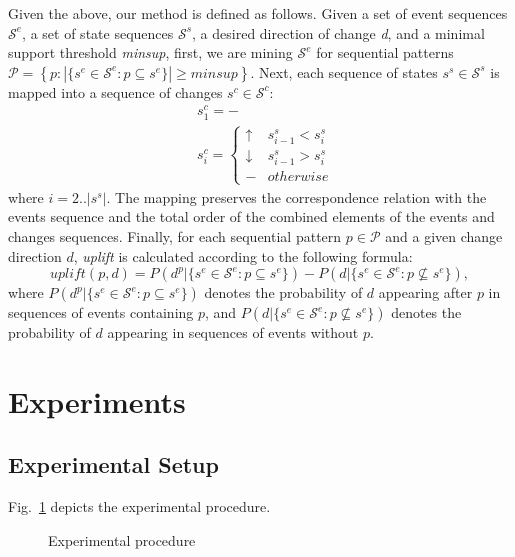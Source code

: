\documentclass[runningheads,a4paper]{llncs}
\begin{document}
Given the above, our method is defined as follows.
Given a set of event sequences $\mathcal{S}^e$, a set of state sequences $\mathcal{S}^s$, a desired direction of change \textit{d}, and a minimal support threshold \textit{minsup}, first, we are mining $\mathcal{S}^e$ for sequential patterns $\mathcal{P}=\left\{p:|\{s^e\in\mathcal{S}^e:p\subseteq s^e\}|\geq\textit{minsup}\right\}$.
Next, each sequence of states $s^s\in\mathcal{S}^s$ is mapped into a sequence of changes $s^c\in\mathcal{S}^c$:
\begin{equation*}
\begin{split}
&s^c_1=-\\
&s^c_i=\begin{cases}
	\uparrow & s^s_{i-1}<s^s_i \\
	\downarrow & s^s_{i-1}>s^s_i \\
	- & otherwise
\end{cases}
\end{split}
\end{equation*}
where $i=2..|s^s|$.
The mapping preserves the correspondence relation with the events sequence and the total order of the combined elements of the events and changes sequences.
Finally, for each sequential pattern $p\in\mathcal{P}$ and a given change direction $d$, \textit{uplift} is calculated according to the following formula:
\begin{equation*}
\textit{uplift}(p,d)=P(d^p|\{s^e\in\mathcal{S}^e:p\subseteq s^e\})-P(d|\{s^e\in\mathcal{S}^e:p\not\subseteq s^e\}),
\end{equation*}
where $P(d^p|\{s^e\in\mathcal{S}^e:p\subseteq s^e\})$ denotes the probability of $d$ appearing after $p$ in sequences of events containing $p$, and $P(d|\{s^e\in\mathcal{S}^e:p\not\subseteq s^e\})$ denotes the probability of $d$ appearing in sequences of events without $p$.

\section{Experiments}
\label{sec:experiments}
\subsection{Experimental Setup}

Fig.~\ref{fig:setup} depicts the experimental procedure.
\begin{figure}[h]
	\centering
	\caption{Experimental procedure}
	\label{fig:setup}
\end{figure}
\end{document}
